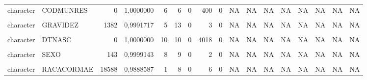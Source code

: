 \begin{table}[!h]
\begin{tabular}[t]{llrrrrrrrrrrrrrrl}
character & CODMUNRES & 0 & 1,0000000 & 6 & 6 & 0 & 400 & 0 & NA & NA & NA & NA & NA & NA & NA & NA\\
\cellcolor{gray!10}{character} & \cellcolor{gray!10}{GESTACAO} & \cellcolor{gray!10}{16329} & \cellcolor{gray!10}{0,9902127} & \cellcolor{gray!10}{15} & \cellcolor{gray!10}{19} & \cellcolor{gray!10}{0} & \cellcolor{gray!10}{6} & \cellcolor{gray!10}{0} & \cellcolor{gray!10}{NA} & \cellcolor{gray!10}{NA} & \cellcolor{gray!10}{NA} & \cellcolor{gray!10}{NA} & \cellcolor{gray!10}{NA} & \cellcolor{gray!10}{NA} & \cellcolor{gray!10}{NA} & \cellcolor{gray!10}{NA}\\
character & GRAVIDEZ & 1382 & 0,9991717 & 5 & 13 & 0 & 3 & 0 & NA & NA & NA & NA & NA & NA & NA & NA\\
\addlinespace
\cellcolor{gray!10}{character} & \cellcolor{gray!10}{PARTO} & \cellcolor{gray!10}{891} & \cellcolor{gray!10}{0,9994660} & \cellcolor{gray!10}{7} & \cellcolor{gray!10}{7} & \cellcolor{gray!10}{0} & \cellcolor{gray!10}{2} & \cellcolor{gray!10}{0} & \cellcolor{gray!10}{NA} & \cellcolor{gray!10}{NA} & \cellcolor{gray!10}{NA} & \cellcolor{gray!10}{NA} & \cellcolor{gray!10}{NA} & \cellcolor{gray!10}{NA} & \cellcolor{gray!10}{NA} & \cellcolor{gray!10}{NA}\\
character & DTNASC & 0 & 1,0000000 & 10 & 10 & 0 & 4018 & 0 & NA & NA & NA & NA & NA & NA & NA & NA\\
\cellcolor{gray!10}{character} & \cellcolor{gray!10}{HORANASC} & \cellcolor{gray!10}{1127} & \cellcolor{gray!10}{0,9993245} & \cellcolor{gray!10}{4} & \cellcolor{gray!10}{5} & \cellcolor{gray!10}{0} & \cellcolor{gray!10}{1441} & \cellcolor{gray!10}{0} & \cellcolor{gray!10}{NA} & \cellcolor{gray!10}{NA} & \cellcolor{gray!10}{NA} & \cellcolor{gray!10}{NA} & \cellcolor{gray!10}{NA} & \cellcolor{gray!10}{NA} & \cellcolor{gray!10}{NA} & \cellcolor{gray!10}{NA}\\
character & SEXO & 143 & 0,9999143 & 8 & 9 & 0 & 2 & 0 & NA & NA & NA & NA & NA & NA & NA & NA\\
\cellcolor{gray!10}{character} & \cellcolor{gray!10}{RACACOR} & \cellcolor{gray!10}{14418} & \cellcolor{gray!10}{0,9913581} & \cellcolor{gray!10}{5} & \cellcolor{gray!10}{8} & \cellcolor{gray!10}{0} & \cellcolor{gray!10}{5} & \cellcolor{gray!10}{0} & \cellcolor{gray!10}{NA} & \cellcolor{gray!10}{NA} & \cellcolor{gray!10}{NA} & \cellcolor{gray!10}{NA} & \cellcolor{gray!10}{NA} & \cellcolor{gray!10}{NA} & \cellcolor{gray!10}{NA} & \cellcolor{gray!10}{NA}\\
\addlinespace
character & RACACORMAE & 18588 & 0,9888587 & 1 & 8 & 0 & 6 & 0 & NA & NA & NA & NA & NA & NA & NA & NA\\

\end{tabular}
\end{table}
